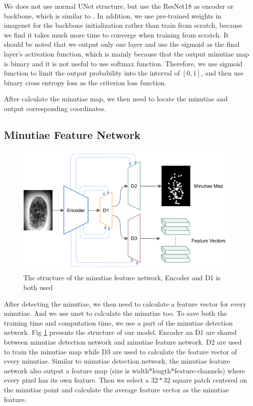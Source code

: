 We does not use normal UNet structure, but use the ResNet18 as encoder or backbone, which is similar to \cite{linknet}.
In addition, we use pre-trained weights in imagenet for the backbone initialization rather than train from scratch, because we find it takes much more time to converge when training from scratch.
It should be noted that we output only one layer and use the sigmoid as the final layer's activation function, which is mainly because that the output minutiae map is binary and it is not useful to use softmax function.
Therefore, we use sigmoid function to limit the output probability into the interval of $ [0, 1] $, and then use binary cross entropy loss as the criterion loss function.

After calculate the minutiae map, we then need to locate the minutiae and output corresponding coordinates.


\subsection{Minutiae Feature Network}

\begin{figure}[htbp]
    \centering
    \includegraphics[width=.9\linewidth]{fig/network-structure.pdf}
    \caption{The structure of the minutiae feature network, Encoder and D1 is both used }
    \label{fig:feat-net}
\end{figure}

After detecting the minutiae, we then need to calculate a feature vector for every minutiae.
And we use unet to calculate the minutiae too.
To save both the training time and computation time, we use a part of the minutiae detection network.
Fig \ref{fig:feat-net} presents the structure of our model.
Encoder an D1 are shared between minutiae detection network and minutiae feature network.
D2 are used to train the minutiae map while D3 are used to calculate the feature vector of every minutiae.
Similar to minutiae detection network, the minutiae feature network also output a feature map (size is width*length*feature-channels) where every pixel has its own feature.
Then we select a $ 32*32 $ square patch centered on the minutiae point and calculate the average feature vector as the minutiae feature.

